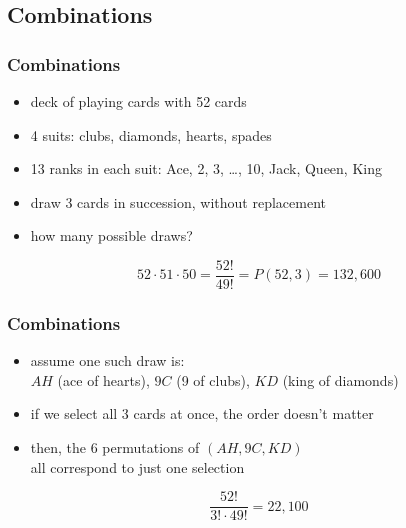 \documentclass[dvipsnames]{beamer}
\begin{document}
\subsection{Combinations}

\begin{frame}
  \frametitle{Combinations}

  \begin{example}
    \begin{itemize}
      \item deck of playing cards with 52 cards
      \item 4 suits: clubs, diamonds, hearts, spades
      \item 13 ranks in each suit: Ace, 2, 3, \ldots, 10, Jack, Queen, King
      \item draw 3 cards in succession, without replacement
      \item how many possible draws?
    \end{itemize}

    \pause
    \begin{equation*}
      52 \cdot 51 \cdot 50 = \frac{52!}{49!} = P(52,3) = 132,600
    \end{equation*}  
  \end{example}
\end{frame}

\begin{frame}
  \frametitle{Combinations}

  \begin{example}
    \begin{itemize}
      \item assume one such draw is:\\
        $AH$ (ace of hearts), $9C$ (9 of clubs), $KD$ (king of diamonds)
      \item if we select all 3 cards at once, the order doesn't matter
      \item then, the 6 permutations of $(AH,9C,KD)$\\
        all correspond to just one selection
    \end{itemize}
    \begin{equation*}
      \frac{52!}{3! \cdot 49!} = 22,100
    \end{equation*}  
  \end{example}
\end{frame}
\end{document}
